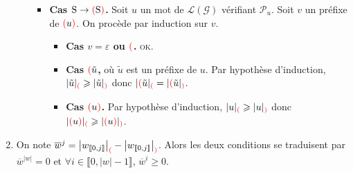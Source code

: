 \begin{enumerate}
\begin{itemize}
\begin{itemize}
					\item \textbf{Cas $\mathrm{S}\to {\color{red}(} \mathrm{S} {\color{red})}$.}
						Soit $u$ un mot de $\mathcal{L}(\mathcal{G})$ vérifiant $\mathcal{P}_u$.
						Soit $v$ un préfixe de ${\color{red}(}u{\color{red})}$.
						On procède par induction sur $v$.
						\begin{itemize}
							\item \textbf{Cas $v = \varepsilon$ ou ${\color{red}(}$.} \textsc{ok}.
							\item \textbf{Cas ${\color{red}(}\tilde{u}$,} où $\tilde{u}$ est un préfixe de $u$.
								Par hypothèse d'induction, $|\tilde{u}|_{{\color{red}(}} \geqslant |\tilde{u}|_{{\color{red})}}$ donc $|{\color{red}(}\tilde{u}|_{{\color{red}(}} = |{\color{red}(}\tilde{u}|_{{\color{red})}}$.
							\item \textbf{Cas ${\color{red}(}u{\color{red})}$.} Par hypothèse d'induction, $|u|_{{\color{red}(}} \geqslant |u|_{{\color{red})}}$ donc $|{\color{red}(}u{\color{red})}|_{{\color{red}(}}\geqslant |{\color{red}(}u{\color{red})}|_{{\color{red})}}$.
						\end{itemize}
				\end{itemize}
		\end{itemize}
	\item On note $\overline w^j= \big| w_{\llbracket 0,j \rrbracket} \big|_{{\color{red}(}} - \big| w_{\llbracket 0,j \rrbracket} \big|_{{\color{red})}}$.
		Alors les deux conditions se traduisent par $\overline w^{|w|} = 0$ et $\forall i \in \llbracket 0,|w|-1 \rrbracket$, $\overline w^i \ge 0$.
\end{enumerate}
